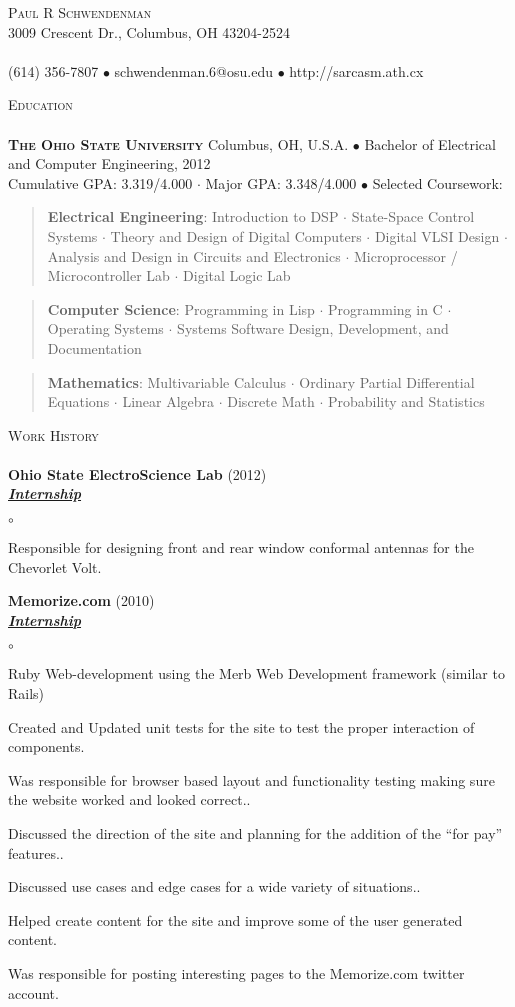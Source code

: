 \documentclass{article}
\newcommand{\area}[2]{\vspace*{-9pt} \begin{verse}\textbf{#1}:   #2 \end{verse}  }
\newcommand{\lineunder}{\vspace*{-8pt} \\ \hspace*{-18pt} \hrulefill \\}
\newcommand{\header}[1]{{\hspace*{-15pt}\vspace*{6pt} \textsc{#1}} \vspace*{-6pt} \lineunder}
\newcommand{\employer}[3]{{ \textbf{#1} (#2)\\ \underline{\textbf{\emph{#3}}}\\  }}
\newcommand{\contact}[3]{
\vspace*{-8pt}
\begin{center}
{\LARGE \scshape {#1}}\\
#2 \lineunder 
#3
\end{center}
\vspace*{-8pt}
}
\newenvironment{achievements}{\begin{list}{$\circ$}{\topsep 0pt \itemsep -2pt}}{\vspace*{4pt}\end{list}}
\newcommand{\schoolwithcourses}[4]{
 \textbf{#1} #2 $\bullet$ #3\\ 
#4 $\bullet$  Selected Coursework:\\
\vspace*{5pt}
}
\begin{document}
\small
\smallskip
\vspace*{-44pt}

\contact{Paul R Schwendenman}
{3009 Crescent Dr., Columbus, OH 43204-2524}
{(614) 356-7807 $\bullet$ schwendenman.6@osu.edu  $\bullet$ http://sarcasm.ath.cx}

\header{Education}

\schoolwithcourses{\textsc{The Ohio State University}}{Columbus, OH, U.S.A.}{Bachelor of Electrical and Computer Engineering, 2012}
{Cumulative GPA: 3.319/4.000 $\cdot$ Major GPA: 3.348/4.000}
	\area{Electrical Engineering}{Introduction to DSP $\cdot$ State-Space Control Systems $\cdot$ Theory and Design of Digital Computers $\cdot$ 
		Digital VLSI Design $\cdot$ Analysis and Design in Circuits and Electronics $\cdot$ Microprocessor / Microcontroller Lab $\cdot$ Digital Logic Lab}
	\area{Computer Science}{Programming in Lisp $\cdot$ Programming in C
		$\cdot$ Operating Systems $\cdot$ Systems Software Design, Development, and Documentation}
	\area{Mathematics}{Multivariable Calculus $\cdot$ Ordinary Partial Differential Equations $\cdot$ Linear Algebra $\cdot$ Discrete Math $\cdot$
		Probability and Statistics}



\header{Work History}
\employer{Ohio State ElectroScience Lab}{2012}{Internship}
	\begin{achievements}
	\item Responsible for designing front and rear window conformal antennas for the Chevorlet Volt.
	\end{achievements}

\employer{Memorize.com}{2010}{Internship}
	\begin{achievements}
	\item Ruby Web-development using the Merb Web Development framework
(similar to Rails) 
	\item Created and Updated unit tests for the site to test the proper
interaction of components.
	\item Was responsible for browser based layout and functionality testing
making sure the website worked and looked correct..
	\item Discussed the direction of the site and planning
for the addition of the ``for pay'' features..
	\item Discussed use cases and edge cases for a wide variety of
situations..
	\item Helped create content for the site and improve some of the
	user generated content.
	\item Was responsible for posting interesting pages to the Memorize.com twitter
	account. 
	\end{achievements}
\end{document}
